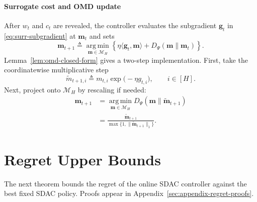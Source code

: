 \documentclass[journal]{IEEEtran}
\theoremstyle{remark}
\begin{document}
\paragraph{Surrogate cost and OMD update}
After $w_t$ and $c_t$ are revealed, the controller evaluates the subgradient
$\mathbf{g}_t$ in \eqref{eq:surr-subgradient} at $\mathbf{m}_t$ and sets
\begin{equation}
\label{eq:alg-omd-argmin}
\mathbf{m}_{t+1}
\triangleq
\operatorname*{arg\,min}_{\mathbf{m}\in\mathcal{M}_H}
\left\{
\eta\langle \mathbf{g}_t,\mathbf{m}\rangle
+D_\Psi(\mathbf{m}\|\mathbf{m}_t)
\right\}.
\end{equation}
Lemma~\ref{lem:omd-closed-form} gives a two-step implementation. First, take the
coordinatewise multiplicative step
\begin{equation}
\label{eq:alg-omd-mult}
\widetilde{m}_{t+1,i}
\triangleq
m_{t,i}\exp\!\bigl(-\eta g_{t,i}\bigr),
\qquad
i\in[H].
\end{equation}
Next, project onto $\mathcal{M}_H$ by rescaling if needed:
\begin{equation}
\label{eq:alg-omd-proj}
\begin{aligned}
\mathbf{m}_{t+1}
&=\operatorname*{arg\,min}_{\mathbf{m}\in\mathcal{M}_H}
D_\Psi(\mathbf{m}\|\widetilde{\mathbf{m}}_{t+1}) \\
&=\frac{\widetilde{\mathbf{m}}_{t+1}}
{\max\{1,\|\widetilde{\mathbf{m}}_{t+1}\|_1\}}.
\end{aligned}
\end{equation}


\section{Regret Upper Bounds}
\label{sec:regret-analysis}
The next theorem bounds the regret of the online SDAC controller against the
best fixed SDAC policy. Proofs appear in
Appendix~\ref{sec:appendix-regret-proofs}.
\end{document}
